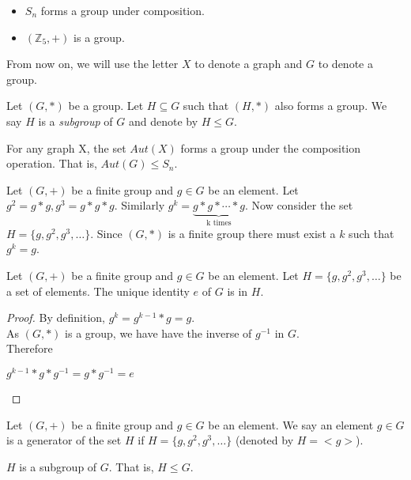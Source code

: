 \begin{eg}
\begin{itemize}
\item $S_n$ forms a group under composition.
\item $(\mathbb{Z}_5,+)$ is a group.
\end{itemize}
\end{eg}

From now on, we will use the letter $X$ to denote a graph and $G$ to denote a group.

\begin{notn} 
Let $(G,*)$ be a group. Let $H\subseteq G$ such that $(H,*)$ also forms a group. We say $H$ is a {\em subgroup} of $G$ and denote by $H\leq G$.   
\end{notn}


\begin{ex}
For any graph X, the set $Aut(X)$ forms a group under the composition operation. That is, $Aut(G)\leq S_n$.
\end{ex}


Let $(G,+)$ be a finite group and $g\in G$ be an element. Let $g^2 =  g*g ,g^3 =  g*g*g $. Similarly $g^k = \underbrace{g*g*\cdots * g}_\text{k times}$. Now consider the set $H=  \{g,g^2,g^3,\ldots\}$. Since $(G,*)$ is a finite group there must exist a $k$ such that $g^k=g$.

\begin{lemma}
Let $(G,+)$ be a finite group and $g\in G$ be an element. Let $H=\{g,g^2,g^3,\ldots\}$ be a set of elements. The unique identity $e$ of $G$ is in $H$.
\end{lemma}
\begin{proof}
By definition, $g^k = g^{k-1}*g = g$. \\
As $(G,*)$ is a group, we have have the inverse of $g^{-1}$ in $G$.\\
Therefore
\begin{center}
$g^{k-1}*g*g^{-1} = g*g^{-1} = e$ 
\end{center}
\end{proof}

\begin{notn}
Let $(G,+)$ be a finite group and $g\in G$ be an element. We say an element $g\in G$ is a generator of the set $H$ if $H=  \{g,g^2,g^3,\ldots\}$ (denoted by $H=<g>$).
\end{notn}

\begin{obs}$H$ is a subgroup of $G$. That is, $H\leq G$.
\end{obs}

